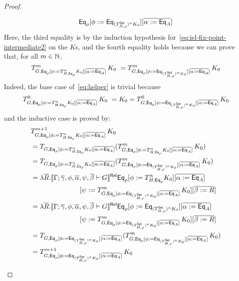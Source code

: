 \documentclass[runningheads]{llncs}
\newcommand{\set}{\mathsf{Set}}
\begin{document}
\begin{proof}
\begin{itemize}
\begin{itemize}
\[\begin{split}
  \Eq_{\rho}[\phi := \Eq_{(T^{\set}_{H,\rho})^n K_0}][\overline{\alpha := \Eq_{A}}]
\end{split}
\]
Here, the third equality is by the induction hypothesis
for~\eqref{eq:iel-fix-point-intermediate2} on the $K$s, and the fourth
equality holds because we can prove that, for all $m \in \mathbb{N}$,
\begin{equation}\label{eq:helper}
T^m_{G,
\Eq_{\rho}[\phi := T^{n}_{H,\Eq_{\rho}} K_0][\overline{\alpha :=
    \Eq_A}]}\,K_0 \ = T^m_{G, \Eq_{\rho}[\phi :=
    \Eq_{(T^{\set}_{H,\rho})^n K_0}][\overline{\alpha :=
      \Eq_A}]}\,K_0
\end{equation}
Indeed, the base case of~\eqref{eq:helper} is trivial because
\[T^0_{G,
  \Eq_{\rho}[\phi := T^{n}_{H,\Eq_{\rho}} K_0][\overline{\alpha :=
      \Eq_A}]}\,K_0 \ = K_0 = T^0_{G, \Eq_{\rho}[\phi :=
    \Eq_{(T^{\set}_{H,\rho})^n K_0}][\overline{\alpha :=
      \Eq_A}]}\,K_0\]
and the inductive case is proved by: \\
\begin{align*}
& T^{m+1}_{G, \Eq_{\rho}[\phi := T^{n}_{H,\Eq_{\rho}} K_0][\overline{\alpha := \Eq_A}]}\,K_0 \\
&= T_{G, \Eq_{\rho}[\phi := T^{n}_{H,\Eq_{\rho}} K_0][\overline{\alpha
        := \Eq_A}]} (T^{m}_{G, \Eq_{\rho}[\phi := T^{n}_{H,\Eq_{\rho}}
      K_0][\overline{\alpha := \Eq_A}]}\,K_0) \\
&= T_{G, \Eq_{\rho}[\phi := T^{n}_{H,\Eq_{\rho}} K_0][\overline{\alpha
        := \Eq_A}]} (T^{m}_{G, \Eq_{\rho}[\phi :=
      \Eq_{(T^{\set}_{H,\rho})^n K_0}][\overline{\alpha :=
        \Eq_A}]}\,K_0) \\
&= \lambda \ol{R}. \relsem{\Gamma; \ol\gamma, \phi, \ol\alpha, \psi,
    \ol\beta \vdash G} \Eq_{\rho} [\phi := T^{n}_{H,\Eq_{\rho}}
    K_0][\overline{\alpha := \Eq_A}] \\
    &\hspace{1in} [\psi := T^{m}_{G, \Eq_{\rho}[\phi
        := \Eq_{(T^{\set}_{H,\rho})^n K_0}][\overline{\alpha :=
          \Eq_A}]}\,K_0][\overline{\beta := R}] \\
&= \lambda \ol{R}. \relsem{\Gamma; \ol\gamma, \phi, \ol\alpha, \psi,
    \ol\beta \vdash G} \Eq_{\rho} [\phi := \Eq_{(T^{\set}_{H,\rho})^n
      K_0}][\overline{\alpha := \Eq_A}] \\
      &\hspace{1in} [\psi := T^{m}_{G,
      \Eq_{\rho}[\phi := \Eq_{(T^{\set}_{H,\rho})^n
          K_0}][\overline{\alpha := \Eq_A}]}\,K_0][\overline{\beta :=
      R}] \\
&= T_{G, \Eq_{\rho}[\phi := \Eq_{(T^{\set}_{H,\rho})^n
        K_0}][\overline{\alpha := \Eq_A}]} (T^{m}_{G, \Eq_{\rho}[\phi
      := \Eq_{(T^{\set}_{H,\rho})^n K_0}][\overline{\alpha :=
        \Eq_A}]}\,K_0) \\
&= T^{m+1}_{G, \Eq_{\rho}[\phi := \Eq_{(T^{\set}_{H,\rho})^n
        K_0}][\overline{\alpha := \Eq_A}]}\,K_0
\end{align*}


\end{itemize}
\end{itemize}
\end{proof}
\end{document}
